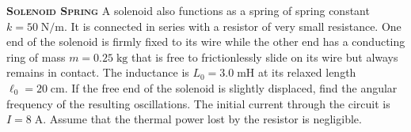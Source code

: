 \begin{problem}{\textbf{\textsc{Solenoid Spring}}\hspace{1mm}}
A solenoid also functions as a spring of spring constant $k=50\;\mathrm{N/m}$. It is connected in series with a resistor of very small resistance. One end of the solenoid is firmly fixed to its wire while the other end has a conducting ring of mass $m=0.25\;\mathrm{kg}$ that is free to frictionlessly slide on its wire but always remains in contact. The inductance is $L_0=3.0\;\mathrm{mH}$ at its relaxed length $\ell_0=20\;\mathrm{cm}$. If the free end of the solenoid is slightly displaced, find the angular frequency of the resulting oscillations. The initial current through the circuit is $I=8\;\mathrm{A}$. Assume that the thermal power lost by the resistor is negligible.
\end{problem}